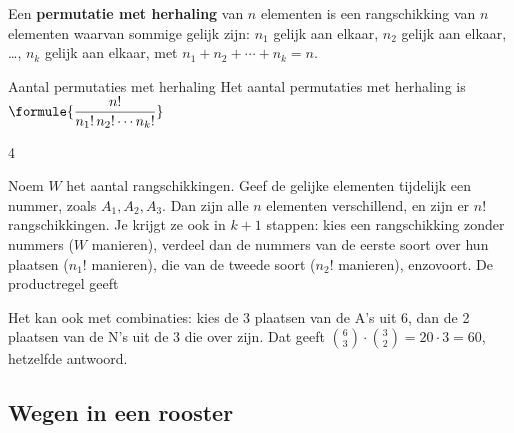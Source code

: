 \begin{theorie}
Een \textbf{\textcolor{accent}{permutatie met herhaling}} van $n$ elementen is een rangschikking van $n$ elementen waarvan sommige gelijk zijn: $n_1$ gelijk aan elkaar, $n_2$ gelijk aan elkaar, \ldots, $n_k$ gelijk aan elkaar, met $n_1 + n_2 + \cdots + n_k = n$.

\begin{stelling}{Aantal permutaties met herhaling}
Het aantal permutaties met herhaling is \quad $\formule{\dfrac{n!}{n_1! \, n_2! \cdots n_k!}}$
\end{stelling}

\begin{alleenvoor}{4}
\begin{bewijs}
Noem $W$ het aantal rangschikkingen. Geef de gelijke elementen tijdelijk een nummer, zoals $A_1, A_2, A_3$. Dan zijn alle $n$ elementen verschillend, en zijn er $n!$ rangschikkingen. Je krijgt ze ook in $k + 1$ stappen: kies een rangschikking zonder nummers ($W$ manieren), verdeel dan de nummers van de eerste soort over hun plaatsen ($n_1!$ manieren), die van de tweede soort ($n_2!$ manieren), enzovoort. De productregel geeft
\end{bewijs}
\end{alleenvoor}
\end{theorie}


Het kan ook met combinaties: kies de 3 plaatsen van de A's uit 6, dan de 2 plaatsen van de N's uit de 3 die over zijn. Dat geeft $\binom63 \cdot \binom32 = 20 \cdot 3 = 60$, hetzelfde antwoord.

\begin{oefeningen}
\end{oefeningen}

\subsection{Wegen in een rooster}

